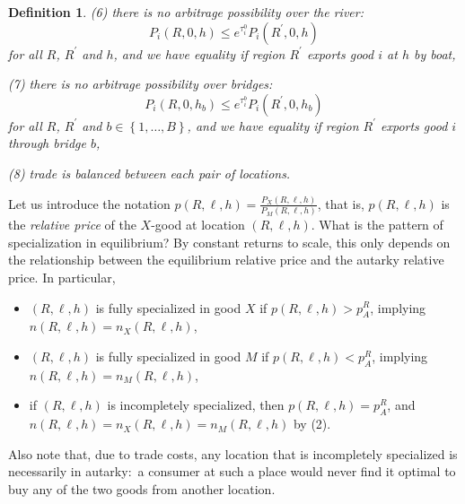 \documentclass[12pt]{article}
\newtheorem{definition}{Definition}
\begin{document}
\begin{definition}
(6) there is no arbitrage possibility over the river:%
\begin{equation*}
P_{i}\left( R,0,h\right) \leq e^{\tau _{i}^{0}}P_{i}\left( R^{\prime
},0,h\right)
\end{equation*}%
for all $R$, $R^{\prime }$ and $h$, and we have equality if region $%
R^{\prime }$ exports good $i$ at $h$ by boat,

(7) there is no arbitrage possibility over bridges:%
\begin{equation*}
P_{i}\left( R,0,h_{b}\right) \leq e^{\tau _{i}^{b}}P_{i}\left( R^{\prime
},0,h_{b}\right)
\end{equation*}%
for all $R$, $R^{\prime }$ and $b\in \left \{ 1,\ldots ,B\right \} $, and we
have equality if region $R^{\prime }$ exports good $i$ through bridge $b$,

(8) trade is balanced between each pair of locations.
\end{definition}

Let us introduce the notation $p\left( R,\ell ,h\right) =\frac{P_{X}\left(
R,\ell ,h\right) }{P_{M}\left( R,\ell ,h\right) }$, that is, $p\left( R,\ell
,h\right) $ is the \textit{relative price} of the $X$-good at location $%
\left( R,\ell ,h\right) $. What is the pattern of specialization in
equilibrium? By constant returns to scale, this only depends on the
relationship between the equilibrium relative price and the autarky
relative price. In particular,

\begin{itemize}
\item $\left( R,\ell ,h\right) $ is fully specialized in good $X$ if $%
p\left( R,\ell ,h\right) >p_{A}^{R}$, implying $n\left( R,\ell ,h\right)
=n_{X}\left( R,\ell ,h\right) $,

\item $\left( R,\ell ,h\right) $ is fully specialized in good $M$ if $%
p\left( R,\ell ,h\right) <p_{A}^{R}$, implying $n\left( R,\ell ,h\right)
=n_{M}\left( R,\ell ,h\right) $,

\item if $\left( R,\ell ,h\right) $ is incompletely specialized, then $%
p\left( R,\ell ,h\right) =p_{A}^{R}$, and $n\left( R,\ell ,h\right)
=n_{X}\left( R,\ell ,h\right) =n_{M}\left( R,\ell ,h\right) $ by (2).
\end{itemize}

Also note that, due to trade costs, any location that is incompletely
specialized is necessarily in autarky:\ a consumer at such a place would
never find it optimal to buy any of the two goods from another location.
\end{document}
